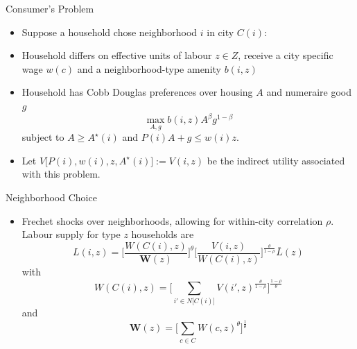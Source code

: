 \documentclass{beamer}
\theoremstyle{plain}
\begin{document}
\begin{frame}{Consumer's Problem}
	\begin{itemize}
		\color{black}
		\itemsep1em
		\item Suppose a household chose neighborhood $i$ in city $C(i)$: \pause
		\item Household differs on effective units of labour $z \in Z$, receive a city specific wage $w(c)$ and a neighborhood-type amenity $b(i, z)$ \pause
		\item Household has Cobb Douglas preferences over housing $A$ and numeraire good $g$
		\begin{equation}\label{utility}
			\max_{A, g} b(i, z)A^{\beta}g^{1-\beta}
		\end{equation} 
		subject to \color{red}$A \geq A^{\star}(i)$ \color{black} and $P(i)A + g \leq w(i)z$. \pause
		
		\item Let $V\big[P(i), w(i), z, A^{\star}(i)\big] := V(i, z)$ be the indirect utility associated with this problem. 
	\end{itemize}
		
\end{frame}

\begin{frame}{Neighborhood Choice}
	\begin{itemize}
		\color{black}
		\item Frechet shocks over neighborhoods, allowing for within-city correlation $\rho$. Labour supply for type $z$ households are 
			\begin{equation}\label{laboursupply}
				L(i, z) = \bigg[\frac{W(C(i), z)}{\boldsymbol{W}(z)}\bigg]^{\theta}\bigg[\frac{V(i, z)}{W(C(i), z)}\bigg]^{\frac{\theta}{1-\rho}}\bar{L}(z)
		\end{equation}
		\pause with 
		 \begin{equation*}
			W(C(i), z) = \bigg[\sum_{i' \in N\big[C(i)\big]}V(i', z)^{\frac{\theta}{1-\rho}}\bigg]^{\frac{1-\rho}{\theta}}
		\end{equation*} 
		\pause and
		\begin{equation*}
			\boldsymbol{W}(z) = \bigg[\sum_{c \in C} W(c, z)^{\theta}\bigg]^{\frac{1}{\theta}}	
		\end{equation*}
	\end{itemize}
\end{frame}
\end{document}
